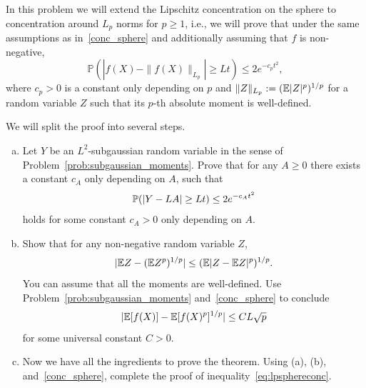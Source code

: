 \begin{myexercise}
    \label{prob:lipschitz_concentration}


    In this problem we will extend the Lipschitz concentration on the sphere to concentration around $L_p$ norms for $p \ge 1$, i.e., we will prove that under the same assumptions as in~\eqref{conc_sphere} and additionally assuming that $f$ is non-negative,
    \begin{equation}\label{eq:lpsphereconc}
    \mathbb{P}(|f(X) - \|f(X)\|_{L_p}| \ge L t)\le 2e^{-c_pt^2},
    \end{equation}
where $c_p>0$ is a constant only depending on $p$ and $\| Z \|_{L_p} := (\mathbb{E} |Z|^p)^{1/p}$ for a random variable $Z$ such that its $p$-th absolute moment is well-defined. 

We will split the proof into several steps. 
\begin{enumerate}[(a)]
    \item Let $Y$ be an $L^2$-subgaussian random variable in the sense of Problem~\ref{prob:subgaussian_moments}. Prove that for any $A \geq 0$ there exists a constant $c_A$ only depending on $A$, such that
    $$ {\mathbb{P}}(|Y-LA| \geq Lt ) \leq 2e^{-c_At^2}$$
    holds for some constant $c_A >0$ only depending on $A$.
    \item Show that for any non-negative random variable $Z$,
    $$
    | \mathbb{E} Z - (\mathbb{E} Z^p)^{1/p}| \le (\mathbb{E} |Z - \mathbb{E} Z|^p)^{1/p}.
    $$
    You can assume that all the moments are well-defined. Use Problem~\ref{prob:subgaussian_moments} and~\eqref{conc_sphere} to conclude
    $$ | \mathbb{E}[f(X)] - \mathbb{E} [f(X)^p]^{1/p}|  \leq CL \sqrt{p}$$
    for some universal constant $C>0$.
    \item Now we have all the ingredients to prove the theorem. Using (a), (b), and~\eqref{conc_sphere}, complete the proof of inequality~\eqref{eq:lpsphereconc}.
\end{enumerate}


\end{myexercise}



